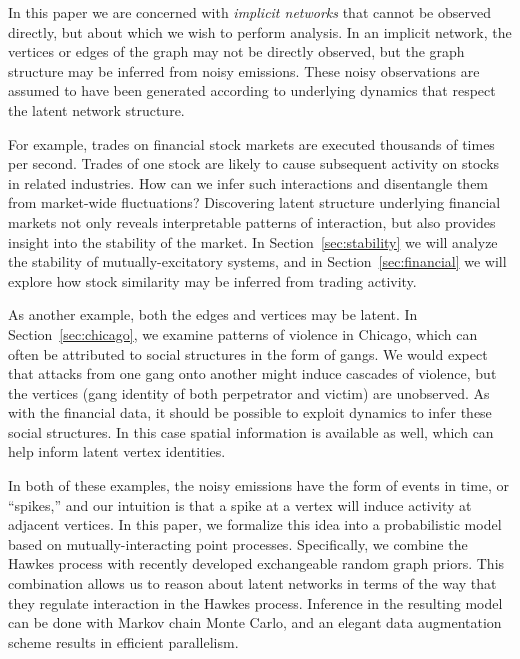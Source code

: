 In this paper we are concerned with \emph{implicit networks} that cannot be observed directly, but about which we wish to perform analysis.  In an implicit network, the vertices or edges of the graph may not be directly observed, but the graph structure may be inferred from noisy emissions.  These noisy observations are assumed to have been generated according to underlying dynamics that respect the latent network structure.

For example, trades on financial stock markets are executed thousands of times per second. Trades of one stock are likely to cause subsequent activity on stocks in related industries. How can we infer such interactions and disentangle them from market-wide fluctuations? Discovering latent structure underlying financial markets not only reveals interpretable patterns of interaction, but also provides insight into the stability of the market. In Section~\ref{sec:stability} we will analyze the stability of mutually-excitatory systems, and in Section~\ref{sec:financial} we will explore how stock similarity may be inferred from trading activity.

As another example, both the edges and vertices may be latent.  In Section~\ref{sec:chicago}, we examine patterns of violence in Chicago, which can often be attributed to social structures in the form of gangs.  We would expect that attacks from one gang onto another might induce cascades of violence, but the vertices (gang identity of both perpetrator and victim) are unobserved.  As with the financial data, it should be possible to exploit dynamics to infer these social structures.  In this case spatial information is available as well, which can help inform latent vertex identities.

In both of these examples, the noisy emissions have the form of events in time, or ``spikes,'' and our intuition is that a spike at a vertex will induce activity at adjacent vertices.  In this paper, we formalize this idea into a probabilistic model based on mutually-interacting point processes.  Specifically, we combine the Hawkes process \cite{Hawkes-1971} with recently developed exchangeable random graph priors.  This combination allows us to reason about latent networks in terms of the way that they regulate interaction in the Hawkes process.  Inference in the resulting model can be done with Markov chain Monte Carlo, and an elegant data augmentation scheme results in efficient parallelism. 

